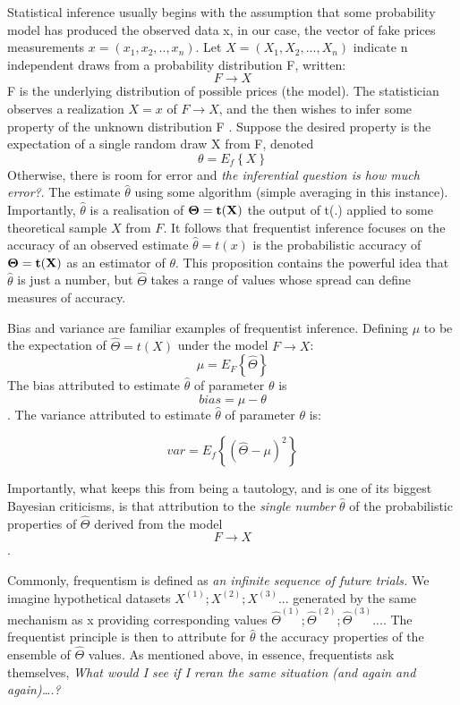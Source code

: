 \documentclass{article}
\begin{document}
Statistical inference usually begins with the assumption that some
probability model has produced the observed data x, in our case, the
vector of fake prices measurements \(x=(x_1,x_2,..,x_n)\). Let
\(X=(X_1,X_2,...,X_n)\) indicate n independent draws from a probability
distribution F, written: \[F \to X\] F is the underlying distribution of
possible prices (the model). The statistician observes a realization
\(X= x\) of \(F \to X\), and the then wishes to infer some property of
the unknown distribution F . Suppose the desired property is the
expectation of a single random draw X from F, denoted
\[\theta=E_f\left\{ X \right\}\] Otherwise, there is room for error and
\emph{the inferential question is how much error?}. The estimate
\(\hat{\theta}\) using some algorithm (simple averaging in this
instance). Importantly, \(\hat{\theta}\) is a realisation of
\(\bf{\Theta}=t(X)\) the output of t(.) applied to some theoretical
sample \(X\) from \(F\). It follows that frequentist inference focuses
on the accuracy of an observed estimate \(\hat{\theta}=t(x)\) is the
probabilistic accuracy of \(\bf{\Theta}=t(X)\) as an estimator of
\(\theta\). This proposition contains the powerful idea that
\(\hat{\theta}\) is just a number, but \(\hat{\Theta}\) takes a range of
values whose spread can define measures of accuracy.

Bias and variance are familiar examples of frequentist inference.
Defining \(\mu\) to be the expectation of \(\hat{\Theta}=t(X)\) under
the model \(F \to X\): \[\mu=E_F\left\{\hat{\Theta}\right\}\] The bias
attributed to estimate \(\hat{\theta}\) of parameter \(\theta\) is
\[bias=\mu - \theta\]. The variance attributed to estimate
\(\hat{\theta}\) of parameter \(\theta\) is:

\[var=E_f\left\{(\hat{\Theta}-\mu)^2\right\}\]

Importantly, what keeps this from being a tautology, and is one of its
biggest Bayesian criticisms, is that attribution to the \emph{single
number} \(\hat{\theta}\) of the probabilistic properties of
\(\hat{\Theta}\) derived from the model \[F \to X\].

Commonly, frequentism is defined as \emph{an infinite sequence of future
trials.} We imagine hypothetical datasets \(X^{(1)};X^{(2)};X^{(3)}...\)
generated by the same mechanism as x providing corresponding values
\(\hat{\Theta}^{(1)};\hat{\Theta}^{(2)};\hat{\Theta}^{(3)}...\). The
frequentist principle is then to attribute for \(\hat{\theta}\) the
accuracy properties of the ensemble of \(\hat{\Theta}\) values. As
mentioned above, in essence, frequentists ask themselves, \emph{What
would I see if I reran the same situation (and again and again)\ldots.?}
\end{document}
